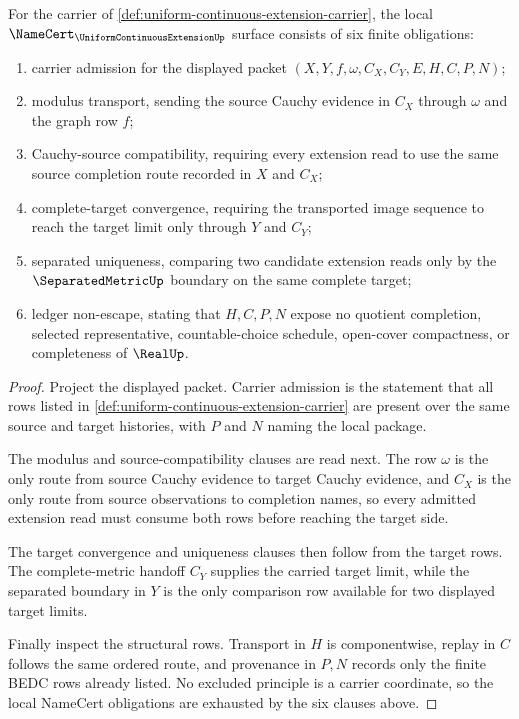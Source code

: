 \begin{theorem}
\label{thm:uniform-continuous-extension-namecert-obligations}
For the carrier of \autoref{def:uniform-continuous-extension-carrier}, the local $\NameCert_{\UniformContinuousExtensionUp}$ surface consists of six finite obligations:
\begin{enumerate}
\item carrier admission for the displayed packet $(X,Y,f,\omega,C_X,C_Y,E,H,C,P,N)$;
\item modulus transport, sending the source Cauchy evidence in $C_X$ through $\omega$ and the graph row $f$;
\item Cauchy-source compatibility, requiring every extension read to use the same source completion route recorded in $X$ and $C_X$;
\item complete-target convergence, requiring the transported image sequence to reach the target limit only through $Y$ and $C_Y$;
\item separated uniqueness, comparing two candidate extension reads only by the $\SeparatedMetricUp$ boundary on the same complete target;
\item ledger non-escape, stating that $H,C,P,N$ expose no quotient completion, selected representative, countable-choice schedule, open-cover compactness, or completeness of $\RealUp$.
\end{enumerate}
\end{theorem}
\begin{proof}
Project the displayed packet. Carrier admission is the statement that all rows listed in \autoref{def:uniform-continuous-extension-carrier} are present over the same source and target histories, with $P$ and $N$ naming the local package.

The modulus and source-compatibility clauses are read next. The row $\omega$ is the only route from source Cauchy evidence to target Cauchy evidence, and $C_X$ is the only route from source observations to completion names, so every admitted extension read must consume both rows before reaching the target side.

The target convergence and uniqueness clauses then follow from the target rows. The complete-metric handoff $C_Y$ supplies the carried target limit, while the separated boundary in $Y$ is the only comparison row available for two displayed target limits.

Finally inspect the structural rows. Transport in $H$ is componentwise, replay in $C$ follows the same ordered route, and provenance in $P,N$ records only the finite BEDC rows already listed. No excluded principle is a carrier coordinate, so the local NameCert obligations are exhausted by the six clauses above.
\end{proof}

